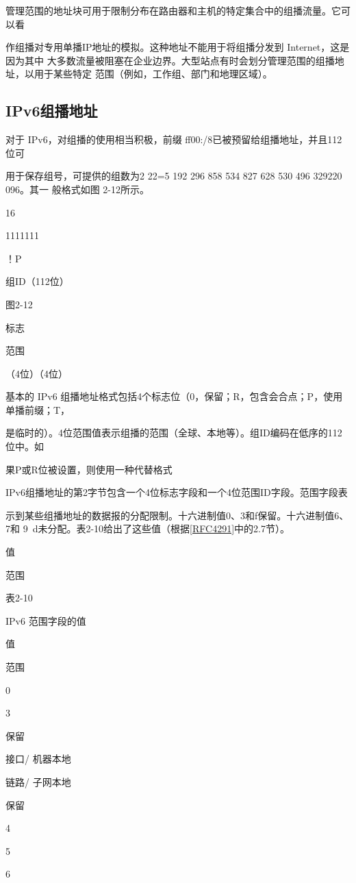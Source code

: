 管理范围的地址块可用于限制分布在路由器和主机的特定集合中的组播流量。它可以看

作组播对专用单播IP地址的模拟。这种地址不能用于将组播分发到 Internet，这是因为其中
大多数流量被阻塞在企业边界。大型站点有时会划分管理范围的组播地址，以用于某些特定
范围（例如，工作组、部门和地理区域）。

\subsection{IPv6组播地址}

对于 IPv6，对组播的使用相当积极，前缀 ff00:/8已被预留给组播地址，并且112位可

用于保存组号，可提供的组数为2 22=5 192 296 858 534 827 628 530 496 329220 096。其一
般格式如图 2-12所示。

16

1111111

！P

组ID（112位）

图2-12

标志

范围

（4位）（4位）

基本的 IPv6 组播地址格式包括4个标志位（0，保留；R，包含会合点；P，使用单播前缀；T，

是临时的）。4位范围值表示组播的范围（全球、本地等）。组ID编码在低序的112位中。如

果P或R位被设置，则使用一种代替格式

IPv6组播地址的第2字节包含一个4位标志字段和一个4位范围ID字段。范围字段表

示到某些组播地址的数据报的分配限制。十六进制值0、3和f保留。十六进制值6、7和
9~d未分配。表2-10给出了这些值（根据\href{https://www.rfc-editor.org/rfc/rfc4291}{[RFC4291]}中的2.7节）。

值

范围

表2-10

IPv6 范围字段的值

值

范围

0

3

保留

接口/ 机器本地

链路/ 子网本地

保留

4

5

6

